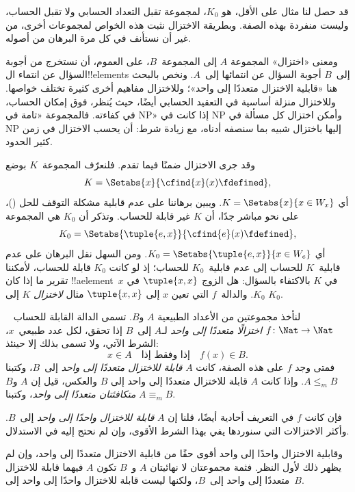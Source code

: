 \documentclass[../../../include/open-logic-section]{subfiles}
\begin{document}

\begin{explain}
قد حصل لنا مثال على الأقل، هو $K_0$، لمجموعة تقبل التعداد الحسابي
ولا تقبل الحساب، وليست منفردة بهذه الصفة. وبطريقة
الاختزال نثبت هذه الخواص لمجموعات أخرى، من غير أن نستأنف
في كل مرة البرهان من أصوله.

ومعنى «اختزال» المجموعة $A$ إلى المجموعة~$B$، على العموم، أن نستخرج من أجوبة
السؤال عن انتماء ال!!{element}s إلى~$B$ أجوبة السؤال عن انتمائها
إلى~$A$. ونخص بالبحث هنا «قابلية الاختزال متعددًا إلى واحد»؛
وللاختزال مفاهيم أخرى كثيرة تختلف خواصها. وللاختزال
منزلة أساسية في التعقيد الحسابي أيضًا، حيث يُنظر، فوق إمكان الحساب، في
كفاءته. فالمجموعة «تامة في NP» إذا كانت في NP وأمكن
اختزال كل مسألة في NP إليها باختزال شبيه بما سنصفه
أدناه، مع زيادة شرط: أن يحسب الاختزال في زمن كثير الحدود.

وقد جرى الاختزال ضمنًا فيما تقدم. فلنعرّف المجموعة~$K$ بوضع
\[
K = \Setabs{x}{\cfind{x}(x) \fdefined},
\]
أي $K=\Setabs{x}{x\in W_x}$. ويبين برهاننا على عدم قابلية مشكلة
التوقف للحل ()، على نحو مباشر جدًا، أن
$K$ غير قابلة للحساب. وتذكر أن $K_0$ هي المجموعة
\[
K_0 = \Setabs{\tuple{e, x}}{\cfind{e}(x) \fdefined },
\]
أي $K_0=\Setabs{\tuple{e,x}}{x\in W_e}$. ومن السهل نقل البرهان على
عدم قابلية~$K$ للحساب إلى عدم قابلية~$K_0$ للحساب؛ إذ لو كانت
$K_0$ قابلة للحساب، لأمكننا تقرير ما إذا كان !!a{element}~$x$ في $K$
بالاكتفاء بالسؤال: هل الزوج $\tuple{x,x}$ في $K_0$. والدالة~$f$
التي تعين $x$ إلى $\tuple{x,x}$ مثال \emph{لاختزال} $K$ إلى $K_0$.
\end{explain}

\begin{defn}
لنأخذ مجموعتين من الأعداد الطبيعية $A$ و$B$. تسمى الدالة القابلة للحساب
~$f\colon\Nat\to\Nat$ \emph{اختزالًا متعددًا إلى واحد} لـ$A$ إلى~$B$
إذا تحقق، لكل عدد طبيعي~$x$، الشرط الآتي، ولا تسمى بذلك إلا حينئذ:
\[
x \in A \quad \text{إذا وفقط إذا} \quad f(x) \in B.
\]
فمتى وجد $f$ على هذه الصفة، كانت $A$ \emph{قابلة للاختزال متعددًا
إلى واحد} إلى~$B$، وكتبنا $A\leq_m B$. وإذا كانت $A$ قابلة للاختزال
متعددًا إلى واحد إلى $B$ والعكس، قيل إن $A$ و$B$ \emph{متكافئتان
متعددًا إلى واحد}، وكتبنا $A\equiv_m B$.
\end{defn}

فإن كانت $f$ في التعريف أحادية أيضًا، قلنا إن $A$
\emph{قابلة للاختزال واحدًا إلى واحد} إلى~$B$. وأكثر الاختزالات التي
سنوردها يفي بهذا الشرط الأقوى، وإن لم نحتج إليه في الاستدلال.

\begin{digress}
وقابلية الاختزال واحدًا إلى واحد أقوى حقًا
من قابلية الاختزال متعددًا إلى واحد، وإن لم يظهر ذلك لأول النظر. فثمة
مجموعتان لا نهائيتان $A$ و~$B$ تكون $A$ فيهما قابلة للاختزال متعددًا
إلى واحد إلى~$B$، ولكنها ليست قابلة للاختزال واحدًا إلى واحد إلى~$B$.
\end{digress}
\end{document}
